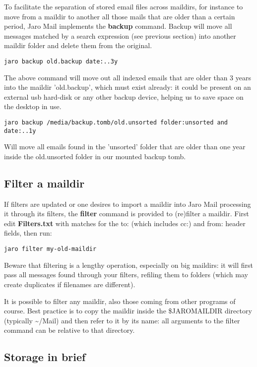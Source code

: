 \documentclass[a4,onecolumn,portrait]{article}
\begin{document}
To facilitate the separation of stored email files across maildirs, for instance to move from a maildir to another all those mails that are older than a certain period, Jaro Mail implements the \textbf{backup} command. Backup will move all messages matched by a search expression (see previous section) into another maildir folder and delete them from the original.

\begin{verbatim}
jaro backup old.backup date:..3y
\end{verbatim}

The above command will move out all indexed emails that are older than
3 years into the maildir 'old.backup', which must exist already: it
could be present on an external usb hard-disk or any other backup
device, helping us to save space on the desktop in use.

\begin{verbatim}
jaro backup /media/backup.tomb/old.unsorted folder:unsorted and date:..1y
\end{verbatim}

Will move all emails found in the 'unsorted' folder that are older than one year inside the old.unsorted folder in our mounted backup tomb.
\subsection{Filter a maildir}
\label{sec-10-3}

If filters are updated or one desires to import a maildir into Jaro
Mail processing it through its filters, the \textbf{filter} command is
provided to (re)filter a maildir. First edit \textbf{Filters.txt} with matches for the to: (which includes cc:) and from: header fields, then run:

\begin{verbatim}
jaro filter my-old-maildir
\end{verbatim}

Beware that filtering is a lengthy operation, especially on big
maildirs: it will first pass all messages found through your filters,
refiling them to folders (which may create duplicates if filenames are different).

It is possible to filter any maildir, also those coming from other
programs of course. Best practice is to copy the maildir inside the
\$JAROMAILDIR directory (typically \textasciitilde{}/Mail) and then refer to it by its
name: all arguments to the filter command can be relative to that
directory.
\subsection{Storage in brief}
\label{sec-10-4}
\end{document}
